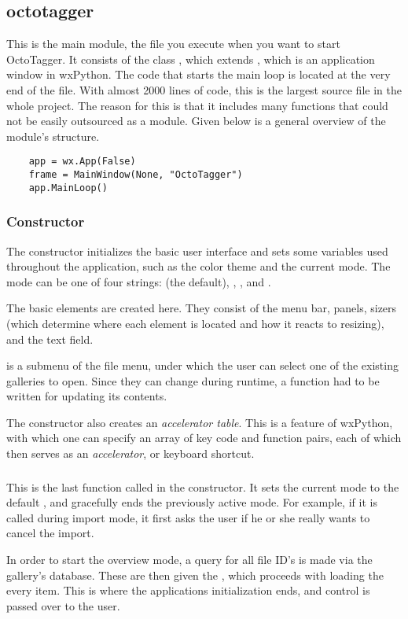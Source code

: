 \subsection{octotagger}
\def\kapitelautor{Erik Ritschl}

This is the main module, the file you execute when you want to start
OctoTagger. It consists of the class , which extends
, which is an application window in wxPython.
The code that starts the main loop is located at the very end of the file. %
With almost 2000 lines of code, this is the largest source file in the whole
project. The reason for this is that it includes many functions that could not
be easily outsourced as a module. Given below is a general overview of the
module's structure.

\begin{verbatim}
	app = wx.App(False)
	frame = MainWindow(None, "OctoTagger")
	app.MainLoop()
\end{verbatim}

\subsubsection{Constructor}

The constructor initializes the basic user interface and sets some variables
used throughout the application, such as the color theme and the current mode.
The mode can be one of four strings:  (the default),
, , and .

The basic elements are created here. They consist of the menu bar, panels,
sizers (which determine where each element is located and how it reacts to
resizing), and the text field. %

 is a submenu of the file menu, under which the user can
select one of the existing galleries to open. Since they can change during
runtime, a function had to be written for updating its contents.

The constructor also creates an \emph{accelerator table}. This is a feature
of wxPython, with which one can specify an array of key code
and function pairs, each of which then serves as an \emph{accelerator}, or
keyboard shortcut.

\subsubsection{}

This is the last function called in the constructor. It sets the current mode
to the default , and gracefully ends the previously active
mode. For example, if it is called during import mode, it first asks the user
if he or she really wants to cancel the import.

In order to start the overview mode, a query for all file ID's is made via the
gallery's database. These are then given the , which proceeds
with loading the every item. This is where the applications initialization
ends, and control is passed over to the user.
